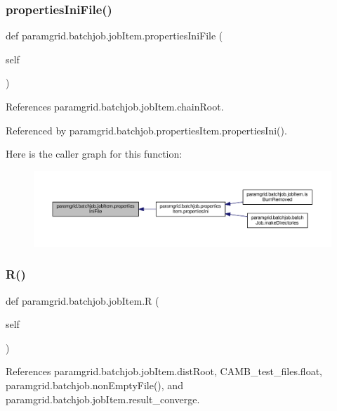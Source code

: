 \subsubsection{\texorpdfstring{properties\+Ini\+File()}{propertiesIniFile()}}
{\footnotesize\ttfamily def paramgrid.\+batchjob.\+job\+Item.\+properties\+Ini\+File (\begin{DoxyParamCaption}\item[{}]{self }\end{DoxyParamCaption})}



References paramgrid.\+batchjob.\+job\+Item.\+chain\+Root.



Referenced by paramgrid.\+batchjob.\+properties\+Item.\+properties\+Ini().

Here is the caller graph for this function\+:
\nopagebreak
\begin{figure}[H]
\begin{center}
\leavevmode
\includegraphics[width=350pt]{classparamgrid_1_1batchjob_1_1jobItem_abedf1639a7b1212c030844b523747d0c_icgraph}
\end{center}
\end{figure}
\mbox{\label{classparamgrid_1_1batchjob_1_1jobItem_aae8ea692f441626dcdebd9c9fbf687e7}} 
\subsubsection{\texorpdfstring{R()}{R()}}
{\footnotesize\ttfamily def paramgrid.\+batchjob.\+job\+Item.\+R (\begin{DoxyParamCaption}\item[{}]{self }\end{DoxyParamCaption})}



References paramgrid.\+batchjob.\+job\+Item.\+dist\+Root, C\+A\+M\+B\+\_\+test\+\_\+files.\+float, paramgrid.\+batchjob.\+non\+Empty\+File(), and paramgrid.\+batchjob.\+job\+Item.\+result\+\_\+converge.



